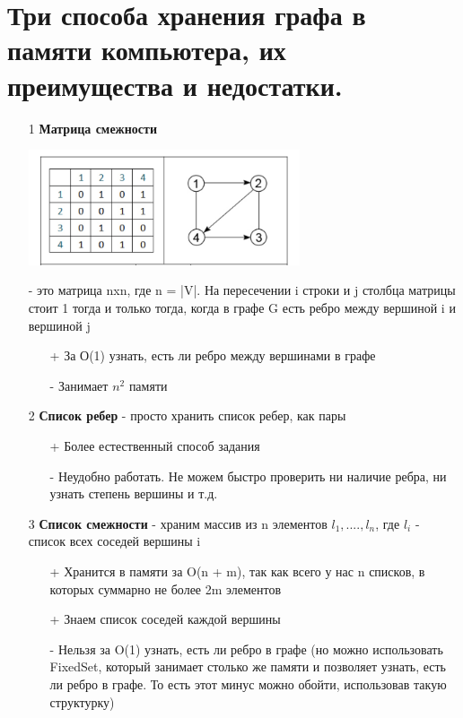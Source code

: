 \section{Три способа хранения графа в памяти компьютера, их преимущества и недостатки.}
\begin{itemize}
    \item [1] \textbf{Матрица смежности} 
    \begin{center}
        \includegraphics[width=8cm]{images/25-28_algo7.PNG}
    \end{center}
    - это матрица nxn, где n = |V|. На пересечении i строки и j столбца матрицы стоит 1 тогда и только тогда, когда в графе G есть ребро между вершиной i и вершиной j
    \begin{itemize}
        \item [+] За О(1) узнать, есть ли ребро между вершинами в графе
        \item [-] Занимает $n^2$ памяти
    \end{itemize}
     \item [2] \textbf{Список ребер} - просто хранить список ребер, как пары 
      \begin{itemize}
        \item [+] Более естественный способ задания
        \item [-] Неудобно работать. Не можем быстро проверить ни наличие ребра, ни узнать степень вершины и т.д.
    \end{itemize}
    \item [3] \textbf{Список смежности} - храним массив из n элементов $l_1,....,l_n$, где $l_i$ - список всех соседей вершины i
    \begin{itemize}
        \item [+] Хранится в памяти за O(n + m), так как всего у нас n списков, в которых суммарно не более 2m элементов
         \item [+] Знаем список соседей каждой вершины
        \item [-] Нельзя за O(1) узнать, есть ли ребро в графе (но можно использовать FixedSet, который занимает столько же памяти и позволяет узнать, есть ли ребро в графе. То есть этот минус можно обойти, использовав такую структурку)
    \end{itemize}
\end{itemize}
\setcounter{section}{26}
